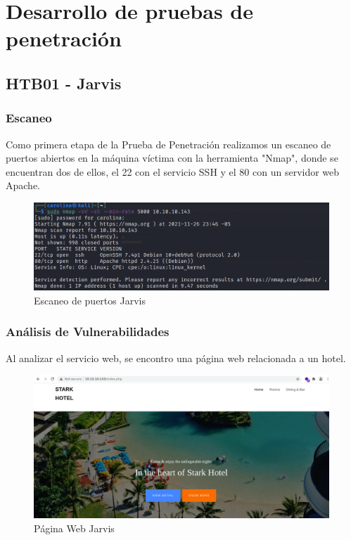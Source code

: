 \section{Desarrollo de pruebas de penetración}

\subsection{HTB01 - Jarvis}

    \subsubsection{Escaneo}

        \large{Como primera etapa de la Prueba de Penetración realizamos un escaneo de puertos abiertos en la máquina víctima con la herramienta "Nmap", donde se encuentran dos de ellos, el 22 con el servicio SSH y el 80 con un servidor web Apache.}
        \par
        \begin{figure}[H]
            \centering
            \includegraphics[width=0.99\textwidth]{imagenes/jarvis/01_nmap_jarvis.png}
            \caption{Escaneo de puertos Jarvis} 
        \end{figure}  

    \subsubsection{Análisis de Vulnerabilidades}

        \large{Al analizar el servicio web, se encontro una página web relacionada a un hotel.}
        \par
        \begin{figure}[H]
            \centering
            \includegraphics[width=0.99\textwidth]{imagenes/jarvis/02_index_jarvis.png}
            \caption{Página Web Jarvis}
        \end{figure}


